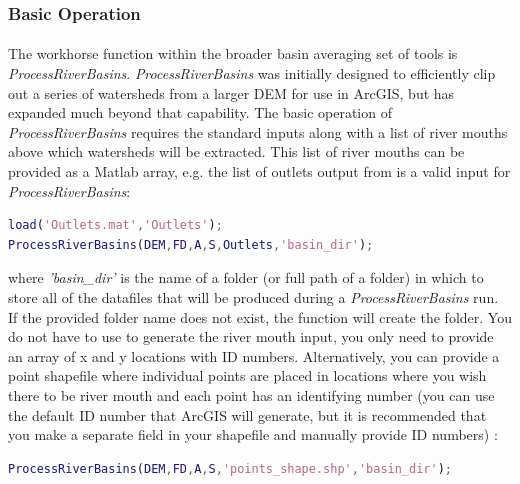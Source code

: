 \subsubsection{Basic Operation}
\paragraph{}The workhorse function within the broader basin averaging set of tools is \textit{ProcessRiverBasins}. \textit{ProcessRiverBasins} was initially designed to efficiently clip out a series of watersheds from a larger DEM for use in ArcGIS, but has expanded much beyond that capability. The basic operation of \textit{ProcessRiverBasins} requires the standard inputs along with a list of river mouths above which watersheds will be extracted. This list of river mouths can be provided as a Matlab array, e.g. the list of outlets output from  is a valid input for \textit{ProcessRiverBasins}:

\begin{lstlisting}[language=Matlab]
% Using output of BasinPicker to run ProcessRiverBasins
load('Outlets.mat','Outlets');
ProcessRiverBasins(DEM,FD,A,S,Outlets,'basin_dir');
\end{lstlisting}

\noindent
where \textit{'basin\_dir'} is the name of a folder (or full path of a folder) in which to store all of the datafiles that will be produced during a \textit{ProcessRiverBasins} run. If the provided folder name does not exist, the function will create the folder. You do not have to use  to generate the river mouth input, you only need to provide an array of x and y locations with ID numbers. Alternatively, you can provide a point shapefile where individual points are placed in locations where you wish there to be river mouth and each point has an identifying number (you can use the default ID number that ArcGIS will generate, but it is recommended that you make a separate field in your shapefile and manually provide ID numbers) :

\begin{lstlisting}[language=Matlab]
% Using a point shapefile to run ProcessRiverBasins
ProcessRiverBasins(DEM,FD,A,S,'points_shape.shp','basin_dir');
\end{lstlisting}

